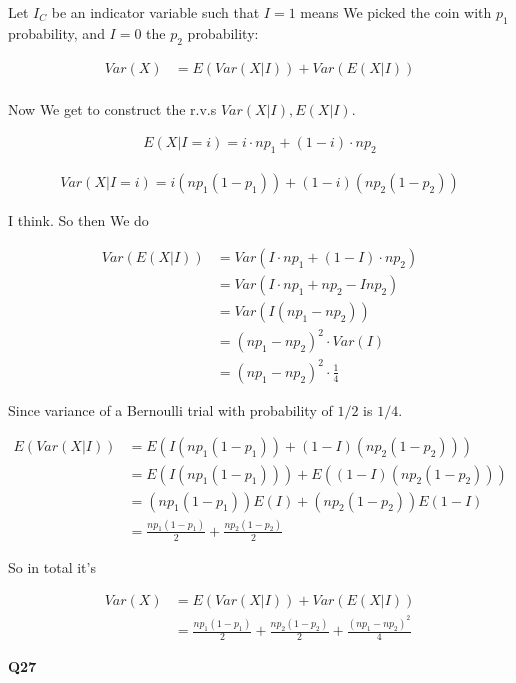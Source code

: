 \documentclass{article}
\begin{document}
			Let $I_C$ be an indicator variable such that $I = 1$ means We picked the coin with $p_1$ probability, and $I = 0$ the $p_2$ probability:
			
			\begin{align*}
			Var(X) &= E(Var(X|I)) + Var(E(X|I))\\
			\end{align*}
			
			Now We get to construct the r.v.s $Var(X|I), E(X|I)$.
			
			\begin{align*}
			E(X|I=i) = i\cdot np_1 + (1-i)\cdot np_2
			\end{align*}
			
			\begin{align*}
			Var(X|I=i) = i(np_1(1-p_1)) + (1-i)(np_2(1-p_2))
			\end{align*}
			
			I think. So then We do
			
			\begin{align*}
			Var(E(X|I)) &= Var(I\cdot np_1 + (1-I)\cdot np_2)\\
			&= Var(I\cdot np_1 + np_2 - Inp_2)\\
			&= Var(I(np_1-np_2))\\
			&= (np_1-np_2)^2\cdot Var(I)\\
			&= (np_1-np_2)^2\cdot \frac{1}{4}
			\end{align*}
			
			Since variance of a Bernoulli trial with probability of $1/2$ is $1/4$.
			
			\begin{align*}
			E(Var(X|I)) &= E(I(np_1(1-p_1)) + (1-I)(np_2(1-p_2))) \\
			&= E(I(np_1(1-p_1))) + E((1-I)(np_2(1-p_2)))\\
			&= (np_1(1-p_1))E(I) + (np_2(1-p_2))E(1-I)\\
			&= \frac{np_1(1-p_1)}{2} + \frac{np_2(1-p_2)}{2}
			\end{align*}
			
			So in total it's
			
			\begin{align*}
			Var(X) &= E(Var(X|I)) + Var(E(X|I))\\
			&= \frac{np_1(1-p_1)}{2} + \frac{np_2(1-p_2)}{2} + \frac{(np_1-np_2)^2}{4}
			\end{align*}
			
			\hfill
			
		\textbf{Q27}
		
\end{document}
